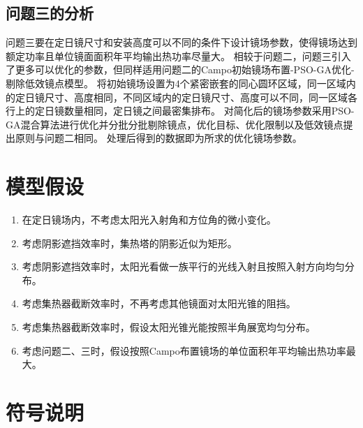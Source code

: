 \documentclass{article}
\numberwithin{equation}{subsection}
\begin{document}
\subsection{问题三的分析}
问题三要在定日镜尺寸和安装高度可以不同的条件下设计镜场参数，使得镜场达到额定功率且单位镜面面积年平均输出热功率尽量大。
相较于问题二，问题三引入了更多可以优化的参数，但同样适用问题二的Campo初始镜场布置-PSO-GA优化-剔除低效镜点模型。
将初始镜场设置为4个紧密嵌套的同心圆环区域，同一区域内的定日镜尺寸、高度相同，不同区域内的定日镜尺寸、高度可以不同，同一区域各行上的定日镜数量相同，定日镜之间最密集排布。
对简化后的镜场参数采用PSO-GA混合算法进行优化并分批分批剔除镜点，优化目标、优化限制以及低效镜点提出原则与问题二相同。
处理后得到的数据即为所求的优化镜场参数。


\newpage

{\centering\section{模型假设}}

\begin{enumerate}
    \item 在定日镜场内，不考虑太阳光入射角和方位角的微小变化。
    \item 考虑阴影遮挡效率时，集热塔的阴影近似为矩形。 
    \item 考虑阴影遮挡效率时，太阳光看做一族平行的光线入射且按照入射方向均匀分布。
    \item 考虑集热器截断效率时，不再考虑其他镜面对太阳光锥的阻挡。
    \item 考虑集热器截断效率时，假设太阳光锥光能按照半角展宽均匀分布。
    \item 考虑问题二、三时，假设按照Campo布置镜场的单位面积年平均输出热功率最大\cite{7}。
\end{enumerate}



{\centering\section{符号说明}}
\end{document}
